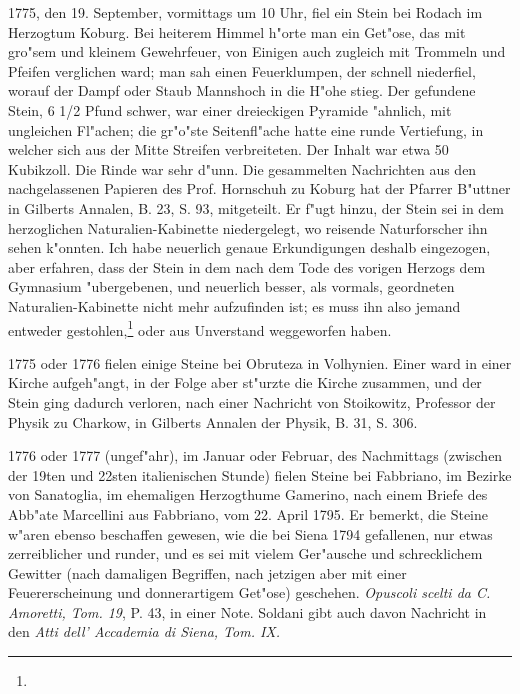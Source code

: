 \documentclass[a4paper, 11pt, oneside, polutonikogreek, german]{article}
\begin{document}
1775, den 19. September, vormittags um 10 Uhr, fiel ein Stein bei Rodach im Herzogtum Koburg. Bei heiterem Himmel h"orte man ein Get"ose, das mit gro"sem und kleinem Gewehrfeuer, von Einigen auch zugleich mit Trommeln und Pfeifen verglichen ward; man sah einen Feuerklumpen, der schnell niederfiel, worauf der Dampf oder Staub Mannshoch in die H"ohe stieg. Der gefundene Stein, 6 1/2 Pfund schwer, war einer dreieckigen Pyramide "ahnlich, mit ungleichen Fl"achen; die gr"o"ste Seitenfl"ache hatte eine runde Vertiefung, in welcher sich aus der Mitte Streifen verbreiteten. Der Inhalt war etwa 50 Kubikzoll. Die Rinde war sehr d"unn. Die gesammelten Nachrichten aus den nachgelassenen Papieren des Prof. Hornschuh zu Koburg hat der Pfarrer B"uttner in Gilberts Annalen, B. 23, S. 93, mitgeteilt. Er f"ugt hinzu, der Stein sei in dem herzoglichen Naturalien-Kabinette niedergelegt, wo reisende Naturforscher ihn sehen k"onnten. Ich habe neuerlich genaue Erkundigungen deshalb eingezogen, aber erfahren, dass der Stein in dem nach dem Tode des vorigen Herzogs dem Gymnasium "ubergebenen, und neuerlich besser, als vormals, geordneten Naturalien-Kabinette nicht mehr aufzufinden ist; es muss ihn also jemand entweder gestohlen,\footnote{} oder aus Unverstand weggeworfen haben.

1775 oder 1776 fielen einige Steine bei Obruteza in Volhynien. Einer ward in einer Kirche aufgeh"angt, in der Folge aber st"urzte die Kirche zusammen, und der Stein ging dadurch verloren, nach einer Nachricht von Stoikowitz, Professor der Physik zu Charkow, in Gilberts Annalen der Physik, B. 31, S. 306.

1776 oder 1777 (ungef"ahr), im Januar oder Februar, des Nachmittags (zwischen der 19ten und 22sten italienischen Stunde) fielen Steine bei Fabbriano, im Bezirke von Sanatoglia, im ehemaligen Herzogthume Gamerino, nach einem Briefe des Abb"ate Marcellini aus Fabbriano, vom 22. April 1795. Er bemerkt, die Steine w"aren ebenso beschaffen gewesen, wie die bei Siena 1794 gefallenen, nur etwas zerreiblicher und runder, und es sei mit vielem Ger"ausche und schrecklichem Gewitter (nach damaligen Begriffen, nach jetzigen aber mit einer Feuererscheinung und donnerartigem Get"ose) geschehen. \emph{Opuscoli scelti da C. Amoretti, Tom. 19}, P. 43, in einer Note. Soldani gibt auch davon Nachricht in den \emph{Atti dell' Accademia di Siena, Tom. IX.}
\end{document}
